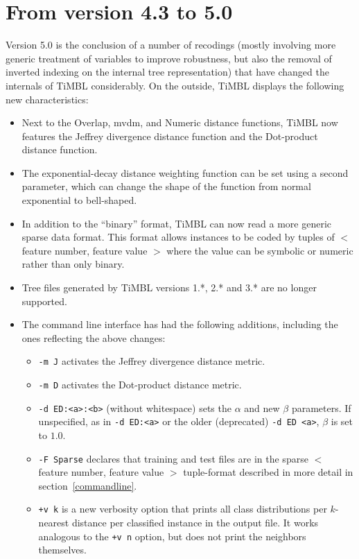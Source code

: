 \documentclass{report}
\begin{document}
\section{From version 4.3 to 5.0}

Version 5.0 is the conclusion of a number of recodings (mostly
involving more generic treatment of variables to improve robustness,
but also the removal of inverted indexing on the internal tree
representation) that have changed the internals of TiMBL
considerably. On the outside, TiMBL displays the following new
characteristics:

\begin{itemize}

\item Next to the Overlap, {\sc mvdm}, and Numeric distance functions,
  TiMBL now features the Jeffrey divergence distance function and the
  Dot-product distance function.

\item The exponential-decay distance weighting function can be set
  using a second parameter, which can change the shape of the function
  from normal exponential to bell-shaped.

\item In addition to the ``binary'' format, TiMBL can now read
  a more generic sparse data format. This format allows instances to
  be coded by tuples of $<$ feature number, feature value $>$ where the
  value can be symbolic or numeric rather than only binary.

\item Tree files generated by TiMBL versions 1.*, 2.* and 3.* are no
longer supported.

\item The command line interface has had the following additions, including the ones reflecting the above changes:

\begin{itemize} 
\item {\tt -m J} activates the Jeffrey divergence distance metric.
\item {\tt -m D} activates the Dot-product distance metric.
\item {\tt -d ED:<a>:<b>} (without whitespace) sets the $\alpha$ and new
  $\beta$ parameters. If unspecified, as in {\tt -d ED:<a>} or the older
  (deprecated) {\tt -d ED <a>}, $\beta$ is set to $1.0$.
\item {\tt -F Sparse} declares that training and test files are in the
  sparse $<$ feature number, feature value $>$ tuple-format described in
  more detail in section~\ref{commandline}.
\item {\tt +v k} is a new verbosity option that prints all class
distributions per $k$-nearest distance per classified instance in the
output file. It works analogous to the {\tt +v n} option, but does not
print the neighbors themselves.
\end{itemize}

\end{itemize}
\end{document}
